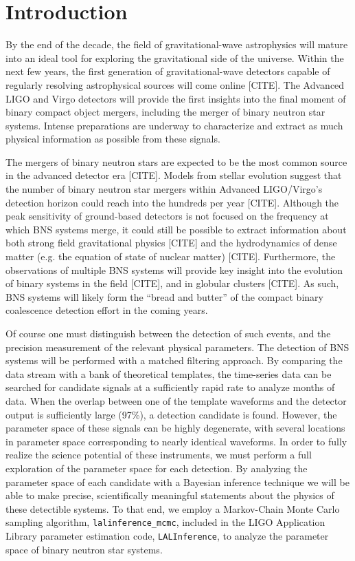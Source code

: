 \documentclass[11pt,a4paper]{emulateapj}
\newcommand{\carl}[1]{{\color{red}  #1}}
\begin{document}
\section{Introduction}

 By the end of the decade, the field of gravitational-wave astrophysics will
 mature into an ideal tool for 
 exploring the gravitational side of the universe. Within the next few
 years, the first generation of gravitational-wave detectors capable 
 of regularly resolving astrophysical sources will come online \carl{[CITE]}.
 The Advanced LIGO and Virgo detectors will provide the first insights
 into the final moment of binary compact object mergers, including the 
 merger of binary neutron star systems.  Intense preparations are underway
 to characterize and extract as much physical 
 information as possible from these signals.
 
The mergers of binary neutron stars are expected to be the most common
source in the advanced detector era \carl{[CITE]}.   Models from stellar 
evolution suggest that the number of binary neutron star mergers within 
Advanced LIGO/Virgo's detection horizon could reach into the hundreds per 
year \carl{[CITE]}.  Although the peak sensitivity of ground-based detectors
is not focused on the frequency at which BNS systems merge, it could still
be possible to extract information about both strong field gravitational 
physics \carl{[CITE]} and the hydrodynamics of dense matter (e.g. the equation 
of state of nuclear matter) \carl{[CITE]}.  Furthermore, the observations of multiple BNS
systems will provide key insight into the evolution of binary systems in the field \carl{[CITE]},
and in globular clusters \carl{[CITE]}. As such, BNS systems will likely 
form the ``bread and butter'' of the compact binary coalescence detection effort in the coming 
years.


Of course one must distinguish between the detection of 
such events, and the precision measurement of the relevant physical parameters.
The detection of BNS systems will be performed with a matched filtering approach.  
By comparing the data stream with a bank of theoretical templates, the 
 time-series data can be searched for candidate signals at a sufficiently
  rapid rate to analyze months of data.  When the overlap between one of the template waveforms and the 
detector output is sufficiently large (97\%), a detection candidate is found.  However,
the parameter space of these signals can be highly degenerate, with several 
locations in parameter space corresponding to nearly identical waveforms.  In 
order to fully realize the science potential of these instruments, we must 
perform a full exploration of the parameter space for each detection.  By 
analyzing the parameter space of each candidate with a Bayesian inference technique 
 we will be able to make precise, scientifically meaningful
statements about the physics of these detectible systems.  To 
that end, we employ a Markov-Chain Monte Carlo sampling algorithm, 
\texttt{lalinference\_mcmc}, included in the LIGO Application Library parameter
estimation code, \texttt{LALInference}, to analyze the parameter space of binary neutron star systems.
\end{document}
